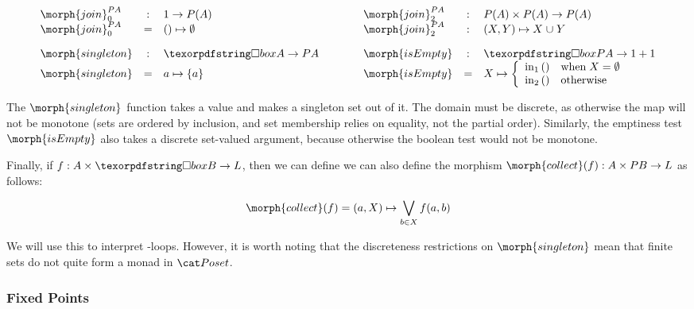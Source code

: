 \begin{displaymath}
  \begin{array}{lclclcl}
    \morph{join}^{\pfinof A}_0& : & 1 \to \pfinof(A) & \qquad & \morph{join}^{\pfinof A}_2 & : & \pfinof(A) \times \pfinof(A) \to \pfinof(A) \\
    \morph{join}^{\pfinof A}_0& = & \etuple{} \mapsto \emptyset  &  & \morph{join}^{\pfinof A}_2 & : & \etuple{X, Y} \mapsto X \cup Y \\[1em]
    \morph{singleton} & : & \iso A \to \pfinof{A} & & \morph{isEmpty} & : & \iso \pfinof{A} \to 1 + 1 \\
    \morph{singleton} & = & a \mapsto \esetraw{a}
    & &
    \morph{isEmpty} & = & X \mapsto \left\{ \begin{array}{ll}
                                              \inj 1 {\etuple{}} & \mbox{when}\;X = \emptyset \\
                                              \inj 2 {\etuple{}} & \mbox{otherwise}
                                            \end{array}
                                    \right.
  \end{array}
\end{displaymath}

\noindent
The $\morph{singleton}$ function takes a value and makes a singleton set out of it. The
domain must be discrete, as otherwise the map will not be monotone (sets are ordered by
inclusion, and set membership relies on equality, not the partial order). Similarly,
the emptiness test $\morph{isEmpty}$ also takes a discrete set-valued argument, because
otherwise the boolean test would not be monotone.

Finally, if $f : A \times \iso B \to L$, then we can define we can also define
the morphism $\morph{collect}(f) : A \times \pfinof{B} \to L$ as follows:

\begin{displaymath}
 \morph{collect}(f)  = (a, X) \mapsto \bigvee_{b \in X} f(a, b)
\end{displaymath}

\noindent
We will use this to interpret -loops. However, it is worth noting that
the discreteness restrictions on $\morph{singleton}$ mean that finite sets do
not quite form a monad in $\Poset$.

\subsubsection{Fixed Points}

